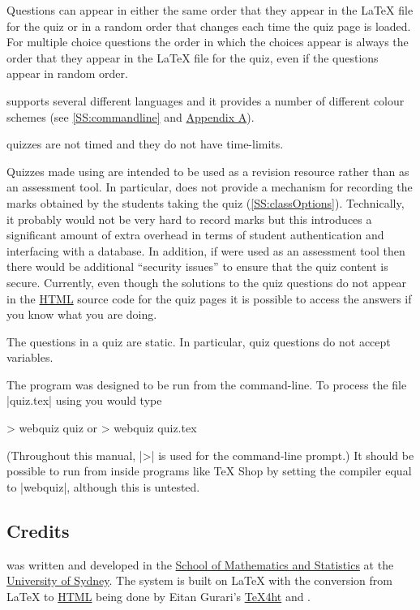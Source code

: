 \documentclass[svgnames]{article}
\newcommand\TeXfht{\href{https://www.ctan.org/tex4ht}{TeX4ht}\xspace}
\newcommand{\HTML}{\href{https://www.w3schools.com/html/html_intro.asp}{HTML}\xspace}
\begin{document}
      Questions can appear in either the same order that they appear in
      the \LaTeX{} file for the quiz or in a random order that changes
      each time the quiz page is loaded. For multiple choice questions the
      order in which the choices appear is always the order that they
      appear in the \LaTeX{} file for the quiz, even if the questions
      appear in random order.

      \WebQuiz supports several different languages and it
      provides a number of different colour schemes (see
      \autoref{SS:commandline} and \hyperref[SS:themes]{Appendix A}).

      \WebQuiz quizzes are not timed and they do not have time-limits.

      Quizzes made using \WebQuiz are intended to be used as a
      revision resource rather than as an assessment tool. In particular,
      \WebQuiz does not provide a mechanism for recording the marks
      obtained by the students taking the quiz
      (\autoref{SS:classOptions}). Technically, it probably would not be
      very hard to record marks but this introduces a significant amount
      of extra overhead in terms of student authentication and interfacing
      with a database. In addition, if \WebQuiz were used as an assessment
      tool then there would be additional ``security issues'' to ensure
      that the quiz content is secure. Currently, even though the
      solutions to the quiz questions do not appear in the \HTML source
      code for the quiz pages it is possible to access the answers if you
      know what you are doing.

      The questions in a \WebQuiz quiz are static. In particular,
      \WebQuiz quiz questions do not accept variables.

      The \WebQuiz program was designed to be run from the command-line.
      To process the file \BashCode|quiz.tex| using \WebQuiz you would
      type
      \begin{bashcode}
        > webquiz quiz         or         > webquiz quiz.tex
      \end{bashcode}
      (Throughout this manual, \BashCode|>| is used for the command-line
      prompt.)
      It should be possible to run \WebQuiz from inside programs like \TeX
      Shop by setting the compiler equal to \BashCode|webquiz|, although
      this is untested.

  \subsection{Credits}
      \WebQuiz{} was written and developed in the
      \href{http://www.maths.usyd.edu.au/}{School of Mathematics and
      Statistics} at the \href{http://www.usyd.edu.au/}{University of
      Sydney}.  The system is built on \LaTeX{} with the conversion from
      \LaTeX{} to \HTML being done by Eitan Gurari's
      \TeXfht and .
\end{document}

